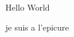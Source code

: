 \documentclass[a4paper]{article}
\begin{document}
  Hello World

  je suis a l'epicure
\end{document}
